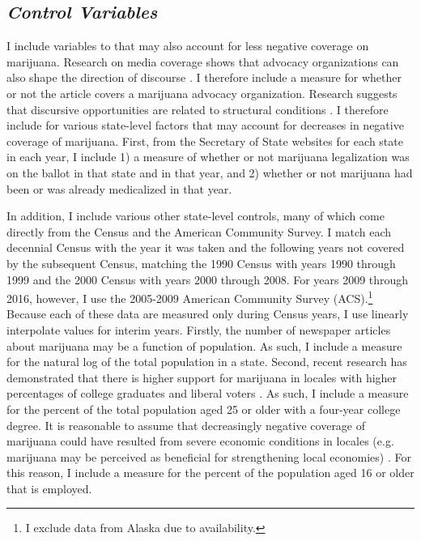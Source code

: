 \subsection{\it{Control Variables}}

I include variables to that may also account for less negative coverage on marijuana. Research on media coverage shows that advocacy organizations can also shape the direction of discourse \citep{seguin_2016,bail_2012}. I therefore include a measure for whether or not the article covers a marijuana advocacy organization. Research suggests that discursive opportunities are related to structural conditions \citep{mccammon_et_al_2007}. I therefore include for various state-level factors that may account for decreases in negative coverage of marijuana. First, from the Secretary of State websites for each state in each year, I include 1) a measure of whether or not marijuana legalization was on the ballot in that state and in that year, and 2) whether or not marijuana had been or was already medicalized in that year. 

In addition, I include various other state-level controls, many of which come directly from the Census and the American Community Survey. I match each decennial Census with the year it was taken and the following years not covered by the subsequent Census, matching the 1990 Census with years 1990 through 1999 and the 2000 Census with years 2000 through 2008. For years 2009 through 2016, however, I use the 2005-2009 American Community Survey (ACS).\footnote{I exclude data from Alaska due to availability.} Because each of these data are measured only during Census years, I use linearly interpolate values for interim years. Firstly, the number of newspaper articles about marijuana may be a function of population. As such, I include a measure for the natural log of the total population in a state. Second, recent research has demonstrated that there is higher support for marijuana in locales with higher percentages of college graduates and liberal voters \citep{caulkins_et_al_2012,rosenthal_and_kubby_1996}. As such, I include a measure for the percent of the total population aged 25 or older with a four-year college degree. It is reasonable to assume that decreasingly negative coverage of marijuana could have resulted from severe economic conditions in locales (e.g. marijuana may be perceived as beneficial for strengthening local economies)  \citep{caulkins_et_al_2012,caulkins_2010,miron_2010}. For this reason, I include a measure for the percent of the population aged 16 or older that is employed. 





